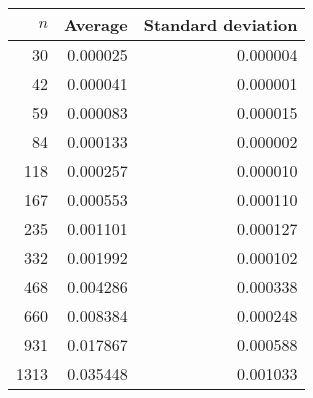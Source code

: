 \begin{tabular}{rrr}
$n$ & Average & Standard deviation\\\hline
30 & 0.000025 & 0.000004\\
42 & 0.000041 & 0.000001\\
59 & 0.000083 & 0.000015\\
84 & 0.000133 & 0.000002\\
118 & 0.000257 & 0.000010\\
167 & 0.000553 & 0.000110\\
235 & 0.001101 & 0.000127\\
332 & 0.001992 & 0.000102\\
468 & 0.004286 & 0.000338\\
660 & 0.008384 & 0.000248\\
931 & 0.017867 & 0.000588\\
1313 & 0.035448 & 0.001033\\
\end{tabular}
